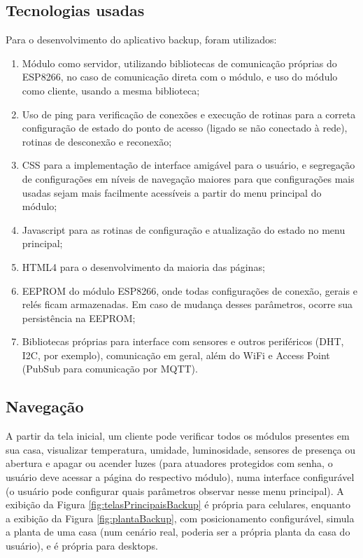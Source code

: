 \subsection{Tecnologias usadas}

Para o desenvolvimento do aplicativo backup, foram utilizados:

\begin{enumerate}
	\item Módulo como servidor, utilizando bibliotecas de comunicação próprias do ESP8266, no caso de comunicação direta com o módulo, e uso do módulo como cliente, usando a mesma biblioteca;
	\item Uso de ping para verificação de conexões e execução de rotinas para a correta configuração de estado do ponto de acesso (ligado se não conectado à rede), rotinas de desconexão e reconexão;
	\item CSS para a implementação de interface amigável para o usuário, e segregação de configurações em níveis de navegação maiores para que configurações mais usadas sejam mais facilmente acessíveis a partir do menu principal do módulo;
	\item Javascript para as rotinas de configuração e atualização do estado no menu principal;
	\item HTML4 para o desenvolvimento da maioria das páginas;
	\item EEPROM do módulo ESP8266, onde todas configurações de conexão, gerais e relés ficam armazenadas. Em caso de mudança desses parâmetros, ocorre sua persistência na EEPROM;
	\item Bibliotecas próprias para interface com sensores e outros periféricos (DHT, I2C, por exemplo), comunicação em geral, além do WiFi e Access Point (PubSub para comunicação por MQTT).
\end{enumerate}

\subsection{Navegação}

A partir da tela inicial, um cliente pode verificar todos os módulos presentes em sua casa, visualizar temperatura, umidade, luminosidade, sensores de presença ou abertura e apagar ou acender luzes (para atuadores protegidos com senha, o usuário deve acessar a página do respectivo módulo), numa interface configurável (o usuário pode configurar quais parâmetros observar nesse menu principal). A exibição da Figura \ref{fig:telasPrincipaisBackup} é própria para celulares, enquanto a exibição da Figura \ref{fig:plantaBackup}, com posicionamento configurável, simula a planta de uma casa (num cenário real, poderia ser a própria planta da casa do usuário), e é própria para desktops.

